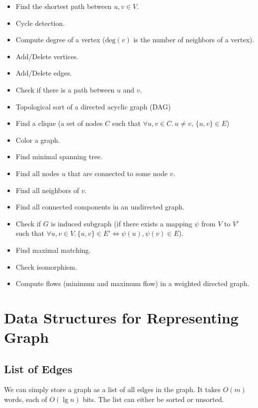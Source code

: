 \begin{multicols*}{2}
    \begin{itemize}
        \item Find the shortest path between $u,v\in V$.
        \item Cycle detection.
        \item Compute degree of a vertex ($\mathrm{deg}(v)$ is the number of neighbors of a vertex).
        \item Add/Delete vertices.
        \item Add/Delete edges.
        \item Check if there is a path between $u$ and $v$.
        \item Topological sort of a directed acyclic graph (DAG)
        \item Find a clique (a set of nodes $C$ such that $\forall u,v \in C.\, u \neq v,\, \{u,v\} \in E$)
        \item Color a graph.
        \item Find minimal spanning tree.
        \item Find all nodes $u$ that are connected to some node $v$.
        \item Find all neighbors of $v$.
        \item Find all connected components in an undirected graph.
        \item Check if $G$ is induced subgraph (if there exists a mapping $\psi$ from $V$ to $V'$ such that $\forall u,v\in V.\, \{u,v\} \in E' \iff \psi(u),\psi(v) \in E$).
        \item Find maximal matching.
        \item Check isomorphism.
        \item Compute flows (minimum and maximum flow) in a weighted directed graph.
    \end{itemize}
\end{multicols*}

\section{Data Structures for Representing Graph}

\subsection{List of Edges}

We can simply store a graph as a list of all edges in the graph. It takes $O(m)$ words, each of $O(\lg n)$ bits. The list can either be sorted or unsorted.

